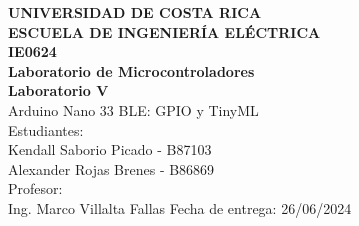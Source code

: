 \documentclass[12pt,letterpaper]{article}
\begin{document}
\begin{titlepage}
\begin{center}
\textbf{UNIVERSIDAD DE COSTA RICA}\\ 
\vspace{6mm}
\textbf{ESCUELA DE INGENIERÍA ELÉCTRICA}\\
\vspace{3cm}
\textbf{IE0624}\\
\textbf{Laboratorio de Microcontroladores}\\
\vspace{3cm}
\textbf{Laboratorio V}\\
\vspace{0.5cm}
Arduino Nano 33 BLE: GPIO y TinyML\\
\vspace{3cm}
Estudiantes:\\
Kendall Saborio Picado - B87103\\
Alexander Rojas Brenes - B86869\\
\vspace{1.5cm}
Profesor:\\
Ing. Marco Villalta Fallas
\vfill
Fecha de entrega: 26/06/2024
\end{center}
\end{titlepage}

\tableofcontents












\end{document}
